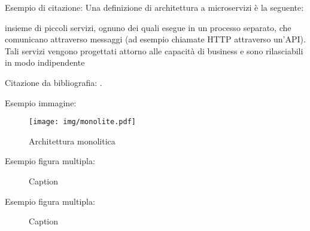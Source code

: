 Esempio di citazione:
Una definizione di architettura a microservizi è la seguente:

    \begin{quoting}
        \omissis insieme di piccoli servizi, ognuno dei quali esegue in un processo separato, che comunicano attraverso messaggi (ad esempio chiamate HTTP attraverso un'\ac{API}). Tali servizi vengono progettati attorno alle capacità di business e sono rilasciabili in modo indipendente \omissis \parencite{labelbibliografia}
    \end{quoting}

Citazione da bibliografia: \parencite{fowler:articoloMicroservizi}.

Esempio immagine:

\begin{figure}[htp]
    \centering
    \texttt{[image: img/monolite.pdf]}
    \caption[Architettura monolitica]{Architettura monolitica}
    \label{fig:monolite}
\end{figure}

Esempio figura multipla:

\begin{figure}[htp]
    \centering
     \quad
     \quad
    \caption{Caption}
    \label{fig:label}
\end{figure}
\pagebreak

Esempio figura multipla:

\begin{figure}[htp]
    \centering
     \quad
     \quad
     \quad
    \caption{Caption}
    \label{fig:label}
\end{figure}